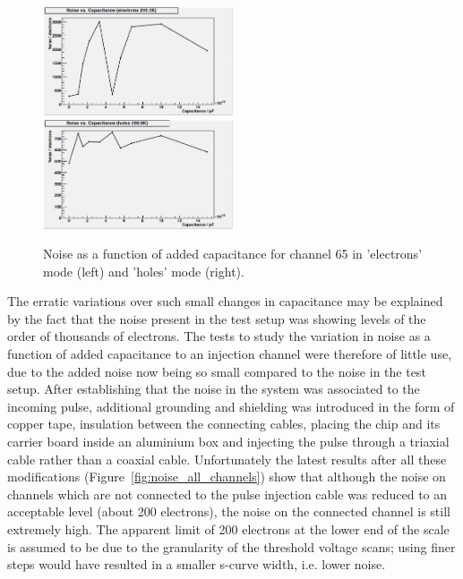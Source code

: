 \begin{figure}[hbtp]
   \centering
     \includegraphics[width=0.5\textwidth]{Chapters/07_Appendices/07c_2_Images/noise_v_capacitance_ch_65_electrons}\hfill
     \includegraphics[width=0.5\textwidth]{Chapters/07_Appendices/07c_2_Images/noise_v_capacitance_ch_65_holes}\hfill
     \caption{Noise as a function of added capacitance for channel 65 in 'electrons' mode (left) and 'holes'
     mode (right).}
     \label{fig:noise_v_capacitance}
\end{figure}

The erratic variations over such small changes in capacitance may be explained by the fact that the noise
present in the test setup was showing levels of the order of thousands of electrons. The tests to study
the variation in noise as a function of added capacitance to an injection channel were therefore of little
use, due to the added noise now being so small compared to the noise in the test setup. After establishing
that the noise in the system was associated to the incoming pulse, additional grounding and shielding was
introduced in the form of copper tape, insulation between the connecting cables, placing the chip and its
carrier board inside an aluminium box and injecting the pulse through a triaxial cable rather than a coaxial
cable. Unfortunately the latest results after all these modifications (Figure~\ref{fig:noise_all_channels})
show that although the noise on channels which are not connected to the pulse injection cable was reduced
to an acceptable level (about 200 electrons), the noise on the connected channel is still extremely high.
The apparent limit of 200 electrons at the lower end of the scale is assumed to be due to the granularity of
the threshold voltage scans; using finer steps would have resulted in a smaller s-curve width, i.e. lower
noise.

